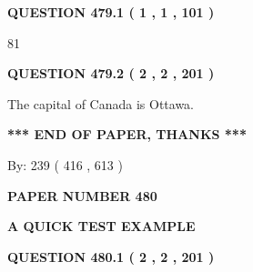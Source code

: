 \documentclass[12pt]{article}
\begin{document}
{\textbf{\Large{QUESTION
479.1 
 ( 1 , 1 , 101 )
}}}
  
  
 
 
\noindent{}

81
 
 
  
\vspace{0.2in}
  
{\textbf{\Large{QUESTION
479.2 
 ( 2 , 2 , 201 )
}}}
  
  
 
 
\noindent{}
 
 
The capital of Canada is Ottawa.
 
 
 
 
   
   
 \vspace{0.2in}
 
   
   
   
   
\vspace{1.0in} 
{\textbf{\large{ *** END OF PAPER, THANKS *** }}} 
   
   
\hspace{1.0in} By: 
 239 ( 416 ,  613 )
   
   
   
   
\newpage 
\setcounter{page}{ 
   480001 } 
   
   
   
   
 {\textbf{ \Large{ PAPER NUMBER  480  }}}
   
   
\vspace{0.2in}
   
   
   
   
   
   
 \vspace{0.2in}
{\LARGE {\textbf{ A QUICK TEST EXAMPLE}}}
   
   
  
\vspace{0.2in}
  
{\textbf{\Large{QUESTION
480.1 
 ( 2 , 2 , 201 )
}}}
  
  
 
 
\noindent{}
 
\end{document}
